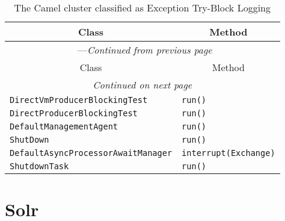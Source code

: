 \begin{center}
\begin{longtable}{ll}
\caption{The Camel cluster classified as Exception Try-Block Logging}\\
\toprule\multicolumn{1}{c}{Class}&\multicolumn{1}{c}{Method}\\\midrule
\endfirsthead

\multicolumn{2}{c}{\tablename\ \thetable{}---\textit{Continued from previous page}} \\\midrule
\multicolumn{1}{c}{Class}&\multicolumn{1}{c}{Method}\\\midrule
\endhead
\multicolumn{2}{c}{\textit{Continued on next page}}\\\midrule
\endfoot
\bottomrule
\endlastfoot

\lstinline/DirectVmProducerBlockingTest/&{\lstinline/run()/}\\
\lstinline/DirectProducerBlockingTest/&{\lstinline/run()/}\\
\lstinline/DefaultManagementAgent/&{\lstinline/run()/}\\
\lstinline/ShutDown/&{\lstinline/run()/}\\
\lstinline/DefaultAsyncProcessorAwaitManager/&{\lstinline/interrupt(Exchange)/}\\
\lstinline/ShutdownTask/&{\lstinline/run()/}\\
\end{longtable}
\end{center}

\section{Solr}\label{solr}

